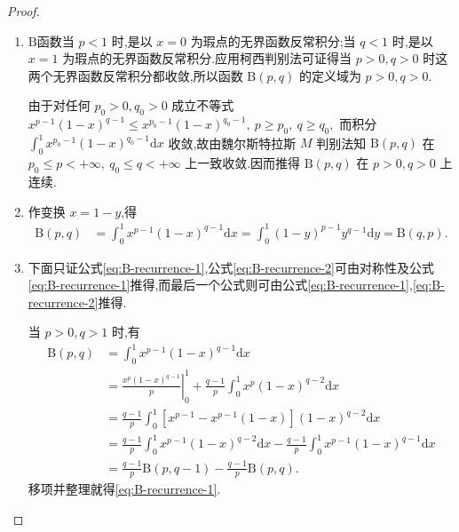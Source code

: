 \documentclass[../../main.tex]{subfiles}%
\begin{document}
\begin{proof}
\begin{enumerate}[(1)]
\item $\mathrm{B}$函数当 $p<1$ 时,是以 $x=0$ 为瑕点的无界函数反常积分;当 $q<1$ 时,是以 $x=1$ 为瑕点的无界函数反常积分.应用柯西判别法可证得当 $p>0,q>0$ 时这两个无界函数反常积分都收敛,所以函数 $\mathrm{B}(p,q)$ 的定义域为 $p>0,q>0$.

由于对任何 $p_0>0,q_0>0$ 成立不等式
$x^{p-1}(1-x)^{q-1} \leqslant x^{p_0-1}(1-x)^{q_0-1},\ p \geqslant p_0,\ q \geqslant q_0,$
而积分 $\int_{0}^{1} x^{p_0-1}(1-x)^{q_0-1}\mathrm{d}x$ 收敛,故由魏尔斯特拉斯 $M$ 判别法知 $\mathrm{B}(p,q)$ 在 $p_0\leqslant p<+\infty,\ q_0\leqslant q<+\infty$ 上一致收敛.因而推得 $\mathrm{B}(p,q)$ 在 $p>0,q>0$ 上连续.

\item 作变换 $x=1-y$,得
\begin{align*}
\mathrm{B}(p,q) &= \int_{0}^{1} x^{p-1}(1-x)^{q-1}\mathrm{d}x = \int_{0}^{1} (1-y)^{p-1}y^{q-1}\mathrm{d}y = \mathrm{B}(q,p).
\end{align*}

\item 下面只证公式\eqref{eq:B-recurrence-1},公式\eqref{eq:B-recurrence-2}可由对称性及公式\eqref{eq:B-recurrence-1}推得,而最后一个公式则可由公式\eqref{eq:B-recurrence-1},\eqref{eq:B-recurrence-2}推得.

当 $p>0,q>1$ 时,有
\begin{align*}
\mathrm{B}(p,q) &= \int_{0}^{1} x^{p-1}(1-x)^{q-1}\mathrm{d}x \\
&= \left.\frac{x^p(1-x)^{q-1}}{p}\right|_{0}^{1} + \frac{q-1}{p}\int_{0}^{1} x^p(1-x)^{q-2}\mathrm{d}x \\
&= \frac{q-1}{p}\int_{0}^{1} \left[x^{p-1} - x^{p-1}(1-x)\right](1-x)^{q-2}\mathrm{d}x \\
&= \frac{q-1}{p}\int_{0}^{1} x^{p-1}(1-x)^{q-2}\mathrm{d}x - \frac{q-1}{p}\int_{0}^{1} x^{p-1}(1-x)^{q-1}\mathrm{d}x \\
&= \frac{q-1}{p}\mathrm{B}(p,q-1) - \frac{q-1}{p}\mathrm{B}(p,q).
\end{align*}
移项并整理就得\eqref{eq:B-recurrence-1}.
\end{enumerate}

\end{proof}
\end{document}
